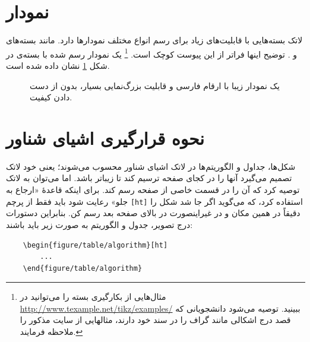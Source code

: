 \section{نمودار}
لاتک بسته‌هایی با قابلیت‌های زیاد برای رسم انواع مختلف نمودارها دارد. مانند بسته‌های  و  . توضیح اینها فراتر از این پیوست کوچک است.%
\footnote{
مثال‌هایی از بکارگیری بسته
را می‌توانید در
\url{http://www.texample.net/tikz/examples/}
ببینید. توصیه می‌شود دانشجویانی که قصد درج اشکالی مانند گراف را در سند خود دارند، مثالهایی از سایت مذکور را ملاحظه فرمایند.
}
یک نمودار رسم شده با بسته‌ی 
 در شکل 
\ref{fig:parabola}
نشان داده شده است.
\begin{figure}[t]
\centering
{}
\caption{یک نمودار زیبا با ارقام فارسی و قابلیت بزرگ‌نمایی بسیار، بدون از دست دادن کیفیت.}
\label{fig:parabola}
\end{figure}

\section{نحوه قرارگیری اشیای شناور}
\label{sec:floatObjs}
شکل‌ها، جداول و الگوریتم‌ها در لاتک اشیای شناور محسوب می‌شوند؛ یعنی خود لاتک تصمیم می‌گیرد آنها را در کجای صفحه ترسیم کند تا زیباتر باشد. اما می‌توان به لاتک توصیه کرد که آن را در قسمت خاصی از صفحه رسم کند. برای اینکه قاعدهٔ «ارجاع به جلو» رعایت شود باید فقط از پرچم
\verb|[ht]|
استفاده کرد، که می‌گوید اگر جا شد شکل را دقیقاً در همین مکان و در غیراینصورت در بالای صفحه بعد رسم کن.
بنابراین دستورات درج تصویر، جدول و الگوریتم به صورت زیر باید باشند:

\begin{latin}
\begin{verbatim}
	\begin{figure/table/algorithm}[ht]
		...
	\end{figure/table/algorithm}
\end{verbatim}
\end{latin}